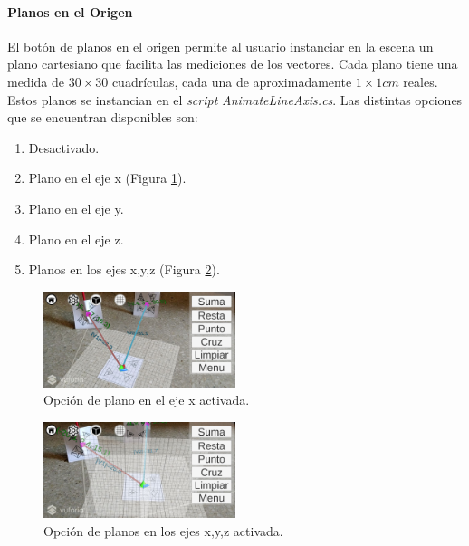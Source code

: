 \paragraph{Planos en el Origen}
El botón de planos en el origen permite al usuario instanciar en la escena un plano cartesiano que facilita las mediciones de los vectores. Cada plano tiene una medida de $30\times 30$ cuadrículas, cada una de aproximadamente $1\times 1cm$ reales. Estos planos se instancian en el \textit{script} \textit{AnimateLineAxis.cs}. Las distintas opciones que se encuentran disponibles son:

\begin{enumerate}
    \item Desactivado.
    \item Plano en el eje x (Figura \ref{fig:vec_opcion_planos_x}).
    \item Plano en el eje y.
    \item Plano en el eje z.
    \item Planos en los ejes x,y,z (Figura \ref{fig:vec_opcion_planos_xyz}).
\end{enumerate}

\begin{figure}[hbt!]
\centering
\includegraphics[width=0.5\textwidth]{figuras/vectores/Planos1.png}
\caption{\label{fig:vec_opcion_planos_x}Opción de plano en el eje x activada.}
\end{figure}

\begin{figure}[hbt!]
\centering
\includegraphics[width=0.5\textwidth]{figuras/vectores/Planos2.png}
\caption{\label{fig:vec_opcion_planos_xyz}Opción de planos en los ejes x,y,z activada.}
\end{figure}
\FloatBarrier

